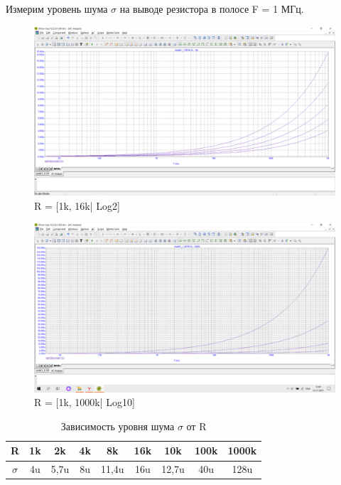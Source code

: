 \documentclass[a4paper, 12pt]{article}%
\begin{document}
\subsubsection{}

Измерим уровень шума $\sigma$ на выводе резистора в полосе F = 1 МГц.

\begin{figure}[h!]
    \centering
    \includegraphics[scale = 0.4 \textwidth]{images/mod1_1_2_1.png}
    \caption{R = [1k, 16k| Log2]}
    \label{fig:R16}
\end{figure}

\begin{figure}[h!]
    \centering
    \includegraphics[scale = 0.4 \textwidth]{images/mod1_1_2_2.png}
    \caption{R = [1k, 1000k| Log10]}
    \label{fig:R1000}
\end{figure}

\begin{table}[h!]
    \centering
    \begin{tabular}{|c|c|c|c|c|c|c|c|c|} \hline
        R & 1k & 2k & 4k & 8k & 16k & 10k & 100k & 1000k\\ \hline
        $\sigma$ & 4u & 5,7u & 8u & 11,4u & 16u & 12,7u & 40u & 128u\\ \hline
    \end{tabular}
    \caption{Зависимость уровня шума $\sigma$ от R}
    \label{tab:sR}
\end{table}
\end{document}
